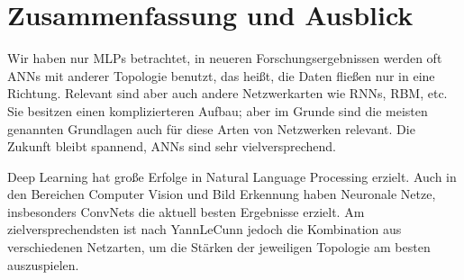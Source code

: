 \section{Zusammenfassung und Ausblick}

Wir haben nur MLPs betrachtet, in neueren Forschungsergebnissen werden oft ANNs mit anderer Topologie benutzt, das heißt, die Daten fließen nur in eine Richtung. Relevant sind aber auch andere Netzwerkarten wie RNNs, RBM, etc. Sie besitzen einen komplizierteren Aufbau; aber im Grunde sind die meisten genannten Grundlagen auch für diese Arten von Netzwerken relevant. Die Zukunft bleibt spannend, ANNs sind sehr vielversprechend.

Deep Learning hat große Erfolge in Natural Language Processing erzielt. Auch in den Bereichen Computer Vision und Bild Erkennung haben Neuronale Netze, insbesonders ConvNets die aktuell besten Ergebnisse erzielt. Am zielversprechendsten ist nach YannLeCunn jedoch die Kombination aus verschiedenen Netzarten, um die Stärken der jeweiligen Topologie am besten auszuspielen. \cite{LeCun2015}

